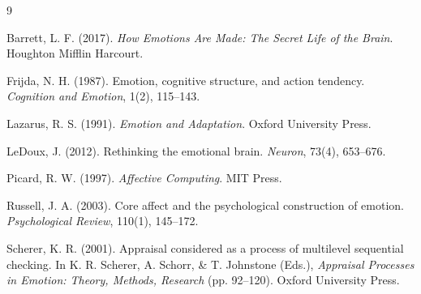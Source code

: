\documentclass[11pt,a4paper]{article}
\begin{document}
\begin{thebibliography}{9}

Barrett, L. F. (2017).
\textit{How Emotions Are Made: The Secret Life of the Brain}.
Houghton Mifflin Harcourt.

Frijda, N. H. (1987).
Emotion, cognitive structure, and action tendency.
\textit{Cognition and Emotion}, 1(2), 115--143.

Lazarus, R. S. (1991).
\textit{Emotion and Adaptation}.
Oxford University Press.

LeDoux, J. (2012).
Rethinking the emotional brain.
\textit{Neuron}, 73(4), 653--676.

Picard, R. W. (1997).
\textit{Affective Computing}.
MIT Press.

Russell, J. A. (2003).
Core affect and the psychological construction of emotion.
\textit{Psychological Review}, 110(1), 145--172.

Scherer, K. R. (2001).
Appraisal considered as a process of multilevel sequential checking.
In K. R. Scherer, A. Schorr, \& T. Johnstone (Eds.),
\textit{Appraisal Processes in Emotion: Theory, Methods, Research}
(pp. 92--120). Oxford University Press.

\end{thebibliography}
\end{document}
